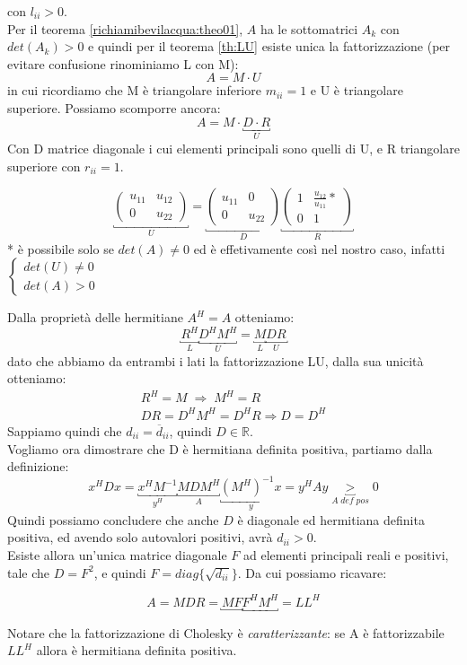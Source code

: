 \begin{thproof}
  con $l_{ii} > 0$. \\
  Per il teorema \ref{richiamibevilacqua:theo01},
  $A$ ha le sottomatrici $A_k$ con $det(A_k) > 0$ e quindi per il
  teorema \ref{th:LU} esiste unica la fattorizzazione (per evitare
  confusione rinominiamo L con M):
  $$ A = M \cdot U $$
  in cui ricordiamo che M \`e triangolare inferiore $m_{ii}=1$ e U \`e
  triangolare superiore. Possiamo scomporre ancora:
  $$ A = M \cdot \underbracket{D \cdot R}_{U}$$
  Con D matrice diagonale i cui elementi principali sono quelli di U,
  e R triangolare superiore con $r_{ii} = 1$.

  $$
  \underbracket{
    \begin{pmatrix}
      u_{11} & u_{12}  \\
      0     & u_{22}
    \end{pmatrix}}_{U} = \underbracket{
    \begin{pmatrix}
      u_{11} & 0  \\
      0     & u_{22}
    \end{pmatrix}}_{D} \underbracket{
    \begin{pmatrix}
      1 & \frac{u_{12}}{u_{11}} * \\
      0 & 1
    \end{pmatrix}}_{R}
  $$
* \`e possibile solo se $det(A)\neq0$ ed \`e effetivamente così nel nostro
caso, infatti $\left\{
  \begin{array}{l}
    det(U) \neq 0 \\
    det(A) > 0
  \end{array}
\right.$

Dalla propriet\`a delle hermitiane $A^{H} = A$ otteniamo:
$$ \underbracket{R^{H}}_{L}\underbracket{D^{H} M^{H}}_{U} =
\underbracket{M}_{L}\underbracket{DR}_{U} $$ dato che abbiamo da entrambi i lati
la fattorizzazione LU, dalla sua unicit\`a otteniamo: 
\[\begin{array}{l}
  R^{H} = M \; \Rightarrow \; M^{H} = R \\
  DR = D^{H}M^{H}= D^{H}R  \Rightarrow  D = D^{H}
\end{array}\]
Sappiamo quindi che $d_{ii}  = \overline{d}_{ii}$, quindi $D \in
\mathbb{R}$.\\

Vogliamo ora dimostrare che D \`e hermitiana definita positiva, partiamo
dalla definizione:
$$ x^{H}Dx = \underbracket{x^{H} M^{-1}}_{y^{H}}
\underbracket{MDM^{H}}_{A} \underbracket{(M^{H})^{-1} x}_{y} = y^{H}Ay
\underbracket{>}_{A\;def\;pos} 0 $$
Quindi possiamo concludere che anche $D$ \`e diagonale ed hermitiana
definita positiva, ed avendo solo autovalori positivi, avr\`a $d_{ii}>0$.\\

Esiste allora un’unica matrice diagonale $F$ ad elementi principali
reali e positivi, tale che $D = F^2$, e quindi $F =
diag\{\sqrt{d_{ii}}\}$. Da cui possiamo ricavare:

$$ A = MDR = \underbracket{M F} \underbracket{F^H M^H} = LL^H $$

Notare che la fattorizzazione di Cholesky \`e \emph{caratterizzante}: se
A \`e fattorizzabile $LL^H$ allora \`e hermitiana definita positiva.
\end{thproof}



